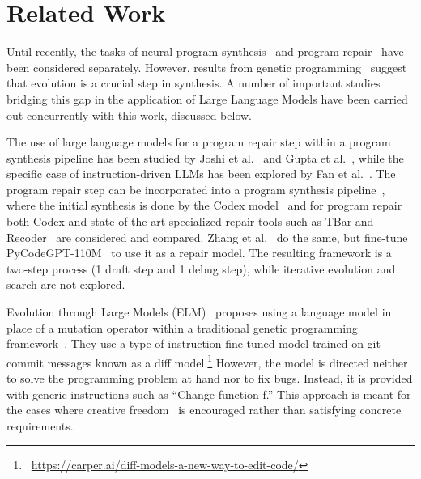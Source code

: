 
\section{Related Work}
\label{sec:seidr-related-work}


Until recently, the tasks of neural program synthesis~\cite{gulwani2017:program} and program repair~\cite{legoues2019:automated, petke2018:genetic} have been considered separately.
However, results from genetic programming~\cite{sobaniaRecentDevelopmentsProgram2021} suggest that evolution is a crucial step in synthesis.
A number of important studies bridging this gap in the application of Large Language Models have been carried out concurrently with this work, discussed below.

The use of large language models for a program repair step within a program synthesis pipeline has been studied by Joshi et al.~\cite{joshi2022:repair:arxiv} and Gupta et al.~\cite{gupta2020:synthesize}, 
while the specific case of instruction-driven LLMs has been explored by Fan et al.~\cite{fan2023:automated}.
The program repair step can be incorporated into a program synthesis pipeline~\cite{fan2023:automated}, where the initial synthesis is done by the Codex model~\cite{chen2021:evaluating} and for program repair both Codex and state-of-the-art specialized repair tools such as TBar and Recoder~\cite{just2014:defects4j} are considered and compared. 
Zhang et al.~\cite{zhang2023:selfedit} do the same, but fine-tune PyCodeGPT-110M~\cite{zan2022:cert} to use it as a repair model. 
The resulting framework is a two-step process (1 draft step and 1 debug step), while iterative evolution and search are not explored. 

Evolution through Large Models (ELM)~\cite{lehman2022:evolution} proposes using a language model in place of a mutation operator within a traditional genetic programming framework~\cite{koza1994:genetic}. They use a type of instruction fine-tuned model trained on git commit messages known as a diff model.\footnote{~\url{https://carper.ai/diff-models-a-new-way-to-edit-code/}}
However, the model is directed neither to solve the programming problem at hand nor to fix bugs.
Instead, it is provided with generic instructions such as ``Change function f.'' 
This approach is meant for the cases where creative freedom~\cite{stanley2015:why} is encouraged rather than satisfying concrete requirements.

